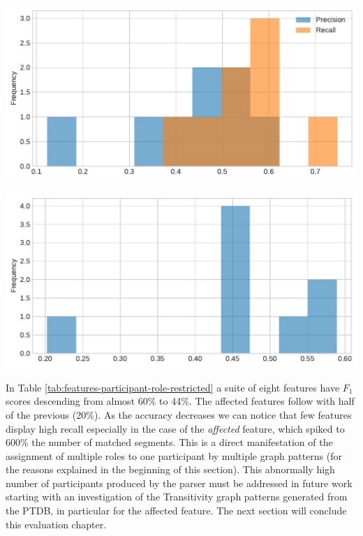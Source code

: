     \vspace{1em}
    \noindent
    \begin{minipage}[b]{0.49\textwidth}
        \centering
        \includegraphics[width=\textwidth]{evaluation-results/figures/PARTICIPANT-ROLE-distribution-PR-10.pdf}
        \label{fig:participant-role-precission-recall}
    \end{minipage}
    \quad
    \begin{minipage}[b]{0.49\textwidth}
        \centering
        \includegraphics[width=\textwidth]{evaluation-results/figures/PARTICIPANT-ROLE-distribution-F1-10.pdf}
        \label{fig:participant-role-precission-f1}
    \end{minipage}
    \vspace{1em}
    
    In Table \ref{tab:features-participant-role-restricted} a suite of eight features have $F_1$ scores descending from almost 60\% to 44\%. The affected features follow with half of the previous (20\%). As the accuracy decreases we can notice that few features display high recall especially in the case of the \textit{affected} feature, which spiked to 600\% the number of matched segments. This is a direct manifestation of the assignment of multiple roles to one participant by multiple graph patterns (for the reasons explained in the beginning of this section). This abnormally high number of participants produced by the parser must be addressed in future work starting with an investigation of the Transitivity graph patterns generated from the PTDB, in particular for the  affected feature. The next section will conclude this evaluation chapter.

